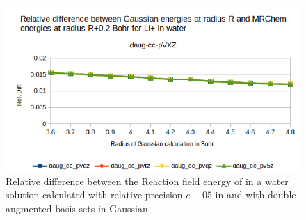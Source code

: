 \documentclass[../master_thesis.tex]{subfiles}
\begin{document}
\begin{figure}[!htb]
  \centering
    \includegraphics[width=\linewidth]{img/lipdaugreldiff02.png}
  \caption[Relative difference of shifted radius  against Gaussian double augmented results]{Relative difference between the Reaction field energy of  in a water solution calculated with relative precision $e-05$ in \mrchem
  and with double augmented basis sets in Gaussian}
  \label{fig:lipreldiff02daug}
\end{figure}
\end{document}
